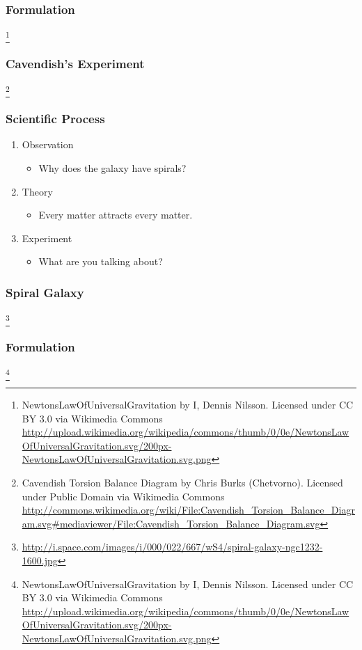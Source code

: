 \documentclass{beamer}
\begin{document}
\begin{CJK}{UTF8}{bsmi}
\begin{frame}
\frametitle{Formulation}
\centerline{}\footnote{NewtonsLawOfUniversalGravitation by I, Dennis Nilsson. Licensed under CC BY 3.0 via Wikimedia Commons \url{http://upload.wikimedia.org/wikipedia/commons/thumb/0/0e/NewtonsLawOfUniversalGravitation.svg/200px-NewtonsLawOfUniversalGravitation.svg.png}}
\end{frame}

\begin{frame}
\frametitle{Cavendish's Experiment}
\centerline{}\footnote{Cavendish Torsion Balance Diagram by Chris Burks (Chetvorno). Licensed under Public Domain via Wikimedia Commons \url{http://commons.wikimedia.org/wiki/File:Cavendish_Torsion_Balance_Diagram.svg\#mediaviewer/File:Cavendish_Torsion_Balance_Diagram.svg}}
\end{frame}


\begin{frame}
\frametitle{Scientific Process} 
\begin{enumerate}
\item Observation
  \begin{itemize}
  \item Why does the galaxy have spirals?
  \end{itemize}
\item Theory
 \begin{itemize}
 \item Every matter attracts every matter.
 \end{itemize}
\item Experiment
  \begin{itemize}
  \item What are you talking about?
  \end{itemize}
\end{enumerate}
\end{frame}


\begin{frame}
\frametitle{Spiral Galaxy}
\centerline{}\footnote{\url{http://i.space.com/images/i/000/022/667/wS4/spiral-galaxy-ngc1232-1600.jpg}}
\end{frame}


\begin{frame}
\frametitle{Formulation}
\centerline{}\footnote{NewtonsLawOfUniversalGravitation by I, Dennis Nilsson. Licensed under CC BY 3.0 via Wikimedia Commons \url{http://upload.wikimedia.org/wikipedia/commons/thumb/0/0e/NewtonsLawOfUniversalGravitation.svg/200px-NewtonsLawOfUniversalGravitation.svg.png}}
\end{frame}


\end{CJK}
\end{document}

